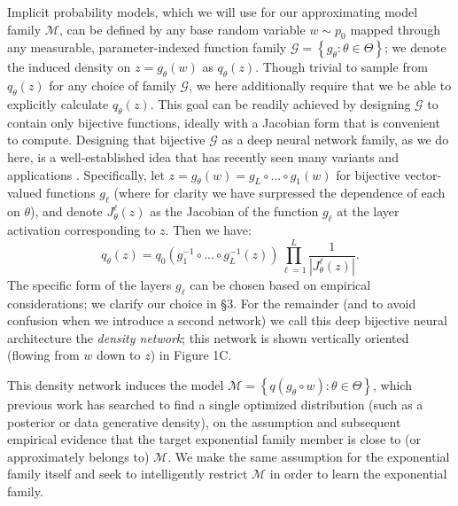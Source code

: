 \documentclass{article}
\begin{document}
Implicit probability models, which we will use for our approximating model family $\mathcal{M}$, can be defined by any base random variable $w\sim p_0$ mapped through any measurable, parameter-indexed function family  $\mathcal{G} = \left\{g_\theta: \theta \in \Theta\right\}$; we denote the induced density on $z=g_\theta(w)$ as $q_\theta(z)$.   
Though trivial to sample from $q_\theta(z)$ for any choice of family $\mathcal{G}$, we here additionally require that we be able to explicitly calculate $q_\theta(z)$.  
This goal can be readily achieved by designing $\mathcal{G}$ to contain only bijective functions, ideally with a Jacobian form that is convenient to compute. %
Designing that bijective $\mathcal{G}$ as a deep neural network family, as we do here, is a well-established idea that has recently seen many variants and applications \cite{mackay1997density, baird2005one, tabak2010density, rippel2013high, uria2013rnade, rezende2015variational, dinh2016density, papamakarios2017masked, jacobsen2018revnet}.  Specifically, let $z = g_\theta(w) = g_L \circ ... \circ g_1(w)$ for bijective vector-valued functions $g_\ell$ (where for clarity we have surpressed the dependence of each on $\theta$), and denote $J^\ell_\theta(z)$ as the Jacobian of the function $g_\ell$ at the layer activation corresponding to $z$.  Then we have:
%
$$q_\theta(z) = q_0\left( g_1^{-1} \circ ... \circ g_L^{-1}(z) \right) \prod_{\ell=1}^L \frac{1}{| J^\ell_\theta(z) |}.$$
%
The specific form of the layers $g_\ell$ can be chosen based on empirical considerations; we clarify our choice in \S3.  For the remainder (and to avoid confusion when we introduce a second network) we call this deep bijective neural architecture the \emph{density network}; this network is shown vertically oriented (flowing from $w$ down to $z$) in Figure 1C.

This density network induces the model $\mathcal{M} = \left\{ q(g_\theta \circ w) : \theta \in \Theta \right\}$, which previous work has searched to find a single optimized distribution (such as a posterior or data generative density), on the assumption and subsequent empirical evidence that the target exponential family member is close to (or approximately belongs to) $\mathcal{M}$.   We make the same assumption for the exponential family itself and seek to intelligently restrict $\mathcal{M}$ in order to learn the exponential family.  

 
\end{document}
